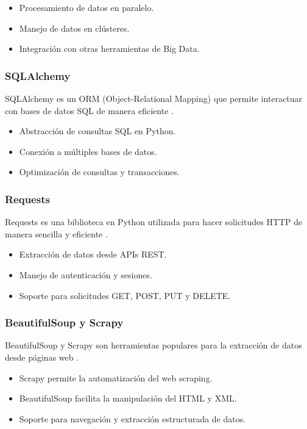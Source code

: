 \begin{itemize}
	\item Procesamiento de datos en paralelo.
	\item Manejo de datos en clústeres.
	\item Integración con otras herramientas de Big Data.
\end{itemize}

\subsubsection{SQLAlchemy}
SQLAlchemy es un ORM (Object-Relational Mapping) que permite interactuar con bases de datos SQL de manera eficiente \cite{bayer2010sqlalchemy}.

\begin{itemize}
	\item Abstracción de consultas SQL en Python.
	\item Conexión a múltiples bases de datos.
	\item Optimización de consultas y transacciones.
\end{itemize}

\subsubsection{Requests}
Requests es una biblioteca en Python utilizada para hacer solicitudes HTTP de manera sencilla y eficiente \cite{reitz2011requests}.

\begin{itemize}
	\item Extracción de datos desde APIs REST.
	\item Manejo de autenticación y sesiones.
	\item Soporte para solicitudes GET, POST, PUT y DELETE.
\end{itemize}

\subsubsection{BeautifulSoup y Scrapy}
BeautifulSoup y Scrapy son herramientas populares para la extracción de datos desde páginas web \cite{richardson2007beautifulsoup}.

\begin{itemize}
	\item Scrapy permite la automatización del web scraping.
	\item BeautifulSoup facilita la manipulación del HTML y XML.
	\item Soporte para navegación y extracción estructurada de datos.
\end{itemize}

